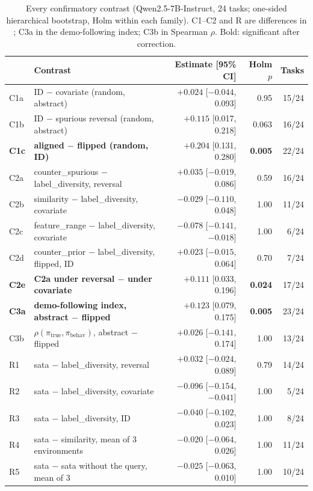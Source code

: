 \begin{table}[h]
\centering\small
\caption{Every confirmatory contrast (Qwen2.5-7B-Instruct, 24 tasks; one-sided hierarchical bootstrap, Holm within each family). C1--C2 and R are differences in \AUROC; C3a in the demo-following index; C3b in Spearman $\rho$. Bold: significant after correction.}
\label{tab:contrasts}
\begin{tabular}{@{}llrrr@{}}
\toprule
& \textbf{Contrast} & \textbf{Estimate [95\% CI]} & \textbf{Holm $p$} & \textbf{Tasks} \\
\midrule
C1a & ID $-$ covariate (random, abstract) & $+0.024$ [$-0.044$, 0.093] & 0.95 & 15/24 \\
C1b & ID $-$ spurious reversal (random, abstract) & $+0.115$ [0.017, 0.218] & 0.063 & 16/24 \\
\textbf{C1c} & \textbf{aligned $-$ flipped (random, ID)} & $\mathbf{+0.204}$ [0.131, 0.280] & \textbf{0.005} & 22/24 \\
C2a & counter\_spurious $-$ label\_diversity, reversal & $+0.035$ [$-0.019$, 0.086] & 0.59 & 16/24 \\
C2b & similarity $-$ label\_diversity, covariate & $-0.029$ [$-0.110$, 0.048] & 1.00 & 11/24 \\
C2c & feature\_range $-$ label\_diversity, covariate & $-0.078$ [$-0.141$, $-0.018$] & 1.00 & 6/24 \\
C2d & counter\_prior $-$ label\_diversity, flipped, ID & $+0.023$ [$-0.015$, 0.064] & 0.70 & 7/24 \\
\textbf{C2e} & \textbf{C2a under reversal $-$ under covariate} & $\mathbf{+0.111}$ [0.033, 0.196] & \textbf{0.024} & 17/24 \\
\textbf{C3a} & \textbf{demo-following index, abstract $-$ flipped} & $\mathbf{+0.123}$ [0.079, 0.175] & \textbf{0.005} & 23/24 \\
C3b & $\rho(\pi_{\mathrm{true}}, \pi_{\mathrm{behav}})$, abstract $-$ flipped & $+0.026$ [$-0.141$, 0.174] & 1.00 & 13/24 \\
\midrule
R1 & sata $-$ label\_diversity, reversal & $+0.032$ [$-0.024$, 0.089] & 0.79 & 14/24 \\
R2 & sata $-$ label\_diversity, covariate & $-0.096$ [$-0.154$, $-0.041$] & 1.00 & 5/24 \\
R3 & sata $-$ label\_diversity, ID & $-0.040$ [$-0.102$, 0.023] & 1.00 & 8/24 \\
R4 & sata $-$ similarity, mean of 3 environments & $-0.020$ [$-0.064$, 0.026] & 1.00 & 11/24 \\
R5 & sata $-$ sata without the query, mean of 3 & $-0.025$ [$-0.063$, 0.010] & 1.00 & 10/24 \\

\end{tabular}
\end{table}
